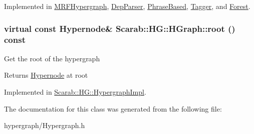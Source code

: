 Implemented in \hyperlink{class_m_r_f_hypergraph_aaac6b68c3ece41ddd1f8107e961879bc}{MRFHypergraph}, \hyperlink{class_dep_parser_a9aebbbde821bad423b6c01cc12f02a2c}{DepParser}, \hyperlink{class_phrase_based_aafc2997b58b3698fed7cb5a1f6f269c6}{PhraseBased}, \hyperlink{class_tagger_a4ebe0aebd7c0392970b401a5a6c6cd72}{Tagger}, and \hyperlink{class_forest_a621a1a65d0f877bb33b15c79f9e24c4d}{Forest}.

\hypertarget{class_scarab_1_1_h_g_1_1_h_graph_a5ede392b158e41dd7e95ded1c4b0b5d6}{
\subsubsection[{root}]{\setlength{\rightskip}{0pt plus 5cm}virtual const {\bf Hypernode}\& Scarab::HG::HGraph::root () const}}
\label{class_scarab_1_1_h_g_1_1_h_graph_a5ede392b158e41dd7e95ded1c4b0b5d6}
Get the root of the hypergraph

\begin{DoxyReturn}{Returns}
\hyperlink{class_scarab_1_1_h_g_1_1_hypernode}{Hypernode} at root 
\end{DoxyReturn}


Implemented in \hyperlink{class_scarab_1_1_h_g_1_1_hypergraph_impl_a31172009b97d179f6b1199f191197a32}{Scarab::HG::HypergraphImpl}.



The documentation for this class was generated from the following file:\begin{DoxyCompactItemize}
\item 
hypergraph/Hypergraph.h\end{DoxyCompactItemize}
